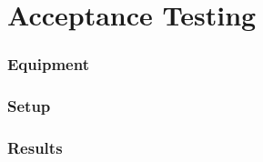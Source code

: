 \section{Acceptance Testing}
 
\subsubsection{Equipment}
 
\subsubsection{Setup}
 
\subsubsection{Results}